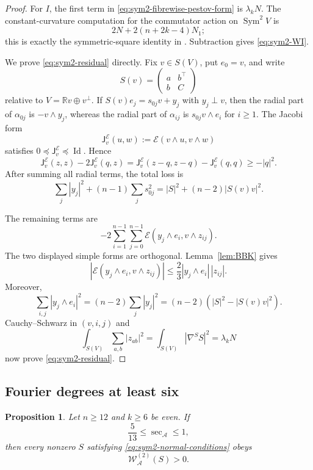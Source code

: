 \documentclass[reqno,11pt]{amsart}
\newtheorem{proposition}[theorem]{Proposition}
\theoremstyle{definition}
\newcommand{\cA}{\mathcal A}
\newcommand{\cE}{\mathcal E}
\newcommand{\Sym}{\operatorname{Sym}}
\newcommand{\Id}{\operatorname{Id}}
\newcommand{\bbR}{\mathbb R}
\begin{document}
\begin{proof}
For $I$, the first term in \eqref{eq:sym2-fibrewise-pestov-form} is
$\lambda_kN$.  The constant-curvature computation for the commutator action
on $\Sym^2V$ is
$$
  2N+2(n+2k-4)N_1;
$$
this is exactly the symmetric-square identity in
\cite[Lemma~4.6]{CLMS24}. Subtraction gives
\eqref{eq:sym2-WI}.

We prove \eqref{eq:sym2-residual} directly. Fix $v\in S(V)$, put
$e_0=v$, and write
$$
  S(v)=
  \begin{pmatrix}
    a&b^\top\\ b&C
  \end{pmatrix}
$$
relative to $V=\bbR v\oplus v^\perp$.  If
$S(v)e_j=s_{0j}v+y_j$ with $y_j\perp v$, then the radial part of
$\alpha_{0j}$ is $-v\wedge y_j$, whereas the radial part of
$\alpha_{ij}$ is $s_{0j}v\wedge e_i$ for $i\geq1$.  The Jacobi form
$$
  \mathsf J_v^{\cE}(u,w):=\cE(v\wedge u,v\wedge w)
$$
satisfies $0\preceq\mathsf J_v^{\cE}\preceq\Id$. Hence
$$
  \mathsf J_v^{\cE}(z,z)-2\mathsf J_v^{\cE}(q,z)
  =\mathsf J_v^{\cE}(z-q,z-q)-\mathsf J_v^{\cE}(q,q)
  \geq-|q|^2.
$$
After summing all radial terms, the total loss is
$$
  \sum_j|y_j|^2+(n-1)\sum_j s_{0j}^2
  =|S|^2+(n-2)|S(v)v|^2.
$$

The remaining terms are
$$
 -2\sum_{i=1}^{n-1}\sum_{j=0}^{n-1}
 \cE(y_j\wedge e_i,v\wedge z_{ij}).
$$
The two displayed simple forms are orthogonal.  Lemma~\ref{lem:BBK} gives
$$
  |\cE(y_j\wedge e_i,v\wedge z_{ij})|
  \leq\frac23|y_j\wedge e_i|\,|z_{ij}|.
$$
Moreover,
$$
  \sum_{i,j}|y_j\wedge e_i|^2
  =(n-2)\sum_j|y_j|^2
  =(n-2)(|S|^2-|S(v)v|^2).
$$
Cauchy--Schwarz in $(v,i,j)$ and
$$
  \int_{S(V)}\sum_{a,b}|z_{ab}|^2
  =\int_{S(V)}|\nabla^SS|^2
  =\lambda_kN
$$
now prove \eqref{eq:sym2-residual}.
\end{proof}

\subsection{Fourier degrees at least six}

\begin{proposition}
\label{prop:sym2-high-degree}
Let $n\geq12$ and $k\geq6$ be even. If
$$
  \frac5{13}\leq\sec_{\cA}\leq1,
$$
then every nonzero $S$ satisfying \eqref{eq:sym2-normal-conditions} obeys
$$
  \mathscr W^{(2)}_{\cA}(S)>0.
$$
\end{proposition}
\end{document}
